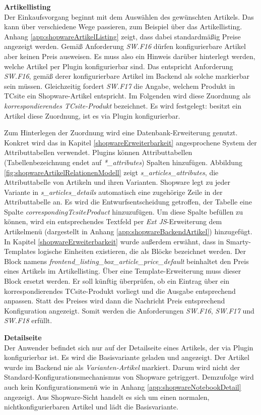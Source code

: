 \documentclass[11pt, a4paper, titlepage, listof=totoc, bibliography=totoc, index=totoc, twoside, openright, headings=normal, draft]{scrreprt}
\begin{document}
\textbf{Artikellisting}\\
Der Einkaufsvorgang beginnt mit dem Auswählen des gewünschten Artikels. Das kann über verschiedene Wege passieren, zum Beispiel über das Artikellisting. Anhang \ref{app:shopwareArtikelListing} zeigt, dass dabei standardmäßig Preise angezeigt werden. Gemäß Anforderung \emph{SW.F16} dürfen konfigurierbare Artikel aber keinen Preis ausweisen. Es muss also ein Hinweis darüber hinterlegt werden, welche Artikel per Plugin konfigurierbar sind. Das entspricht Anforderung \emph{SW.F16}, gemäß derer konfigurierbare Artikel im Backend als solche markierbar sein müssen. Gleichzeitig fordert \emph{SW.F17} die Angabe, welchem Produkt in TCsite ein Shopware-Artikel entspricht. Im Folgenden wird diese Zuordnung als \emph{korrespondierendes TCsite-Produkt} bezeichnet. Es wird festgelegt: besitzt ein Artikel diese Zuordnung, ist es via Plugin konfigurierbar.

Zum Hinterlegen der Zuordnung wird eine Datenbank-Erweiterung genutzt. Konkret wird das in Kapitel \ref{shopwareErweiterbarkeit} angesprochene System der Attributtabellen verwendet. Plugins können Attributtabellen (Tabellenbezeichnung endet auf \emph{*\_attributes}) Spalten hinzufügen. Abbildung \ref{fig:shopwareArtikelRelationenModell} zeigt \emph{s\_articles\_attributes}, die Attributtabelle von Artikeln und ihren Varianten. Shopware legt zu jeder Variante in \emph{s\_articles\_details} automatisch eine zugehörige Zeile in der Attributtabelle an. Es wird die Entwurfsentscheidung getroffen, der Tabelle eine Spalte \emph{correspondingTcsiteProduct} hinzuzufügen. Um diese Spalte befüllen zu können, wird ein entsprechendes Textfeld per \emph{Ext JS}-Erweiterung dem Artikelmenü (dargestellt in Anhang \ref{app:shopwareBackendArtikel}) hinzugefügt. In Kapitel \ref{shopwareErweiterbarkeit} wurde außerdem erwähnt, dass in Smarty-Templates logische Einheiten existieren, die als Blöcke bezeichnet werden. Der Block namens \emph{frontend\_listing\_box\_article\_price\_default} beinhaltet den Preis eines Artikels im Artikellisting.  Über eine Template-Erweiterung muss dieser Block ersetzt werden. Er soll künftig überprüfen, ob ein Eintrag über ein korrespondierendes TCsite-Produkt vorliegt und die Ausgabe entsprechend anpassen. Statt des Preises wird dann die Nachricht  \glqq Preis entsprechend Konfiguration\grqq{} angezeigt. Somit werden die Anforderungen \emph{SW.F16}, \emph{SW.F17} und \emph{SW.F18} erfüllt.

\textbf{Detailseite}\\
Der Anwender befindet sich nur auf der Detailseite eines Artikels, der via Plugin konfigurierbar ist. Es wird die Basisvariante geladen und angezeigt. Der Artikel wurde im Backend nie als \emph{Varianten-Artikel} markiert. Darum wird nicht der Standard-Konfigurationsmechanismus von Shopware getriggert. Demzufolge wird  auch kein Konfigurationsmenü wie in Anhang \ref{app:shopwareNotebookDetail} angezeigt. Aus Shopware-Sicht handelt es sich um einen normalen, nichtkonfigurierbaren Artikel und lädt die Basisvariante.
\end{document}
